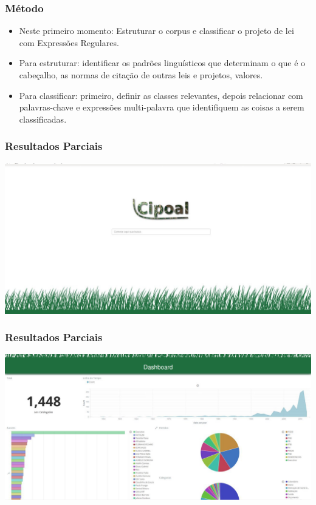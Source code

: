 \documentclass[11pt]{beamer}
\begin{document}
\begin{frame}
\frametitle{Método}
\begin{itemize}
	\item <1-> Neste primeiro momento: Estruturar o corpus e classificar o projeto de lei com Expressões Regulares.\\
	\item <2->Para estruturar: identificar os padrões linguísticos que determinam o que é o cabeçalho, as normas de citação de outras leis e projetos, valores.\\
	\item <3->Para classificar: primeiro, definir as classes relevantes, depois relacionar com palavras-chave e expressões multi-palavra que identifiquem as coisas a serem classificadas.\\
\end{itemize}
\end{frame}
\begin{frame}
\frametitle{Resultados Parciais}
\includegraphics[width=\columnwidth,height=\textheight,keepaspectratio]{Cipoal1.jpg}
\end{frame}
\begin{frame}
\frametitle{Resultados Parciais}
\includegraphics[width=\columnwidth,height=\textheight,keepaspectratio]{Cipoal2.jpg}

\end{frame}
\end{document}
